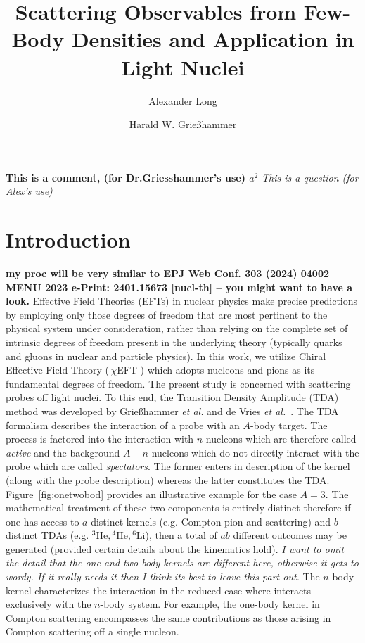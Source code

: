 \documentclass[a4paper,11pt]{article}
\title{Scattering Observables from Few-Body Densities and Application
in Light Nuclei}
\author*{Alexander Long}
\author{Harald W. Grie{\ss}hammer}
\affiliation{Institute for Nuclear Studies, Department of
Physics,\\George Washington University, Washington DC 20052, USA}
\newcommand{\LiS}{{}^{6} \mathrm{Li} }
\newcommand{\HeF}{{}^{4} \mathrm{He}}
\newcommand{\HeT}{{}^{3} \mathrm{He}}
\newcommand{\ques}[1]{\color{red}\textit{ #1 }\color{black}}
\newcommand{\com}[1]{\color{blue}\small\textbf{ #1 }\color{black}\normalsize}
\newcommand{\ChiEFT}{\,$\chi$EFT\,\,}
\begin{document}
\maketitle
\com{This is a comment, (for Dr.Griesshammer's use) $a^2$}
\ques{This is a question (for Alex's use)}
\section{Introduction}
\com{my proc will be very similar to 
    EPJ Web Conf. 303 (2024) 04002
        MENU 2023
e-Print:    2401.15673 [nucl-th] -- you might want to have a look.}
Effective Field Theories (EFTs) in nuclear physics make precise predictions by employing only those
degrees of freedom that are most pertinent to the physical system
under consideration, rather than relying on the complete set of
intrinsic degrees of freedom present in the underlying theory
(typically quarks and gluons in nuclear and particle physics). In this work, we utilize Chiral
Effective Field Theory (\ChiEFT) which adopts nucleons and pions
as its fundamental degrees of freedom.
The present study is concerned with scattering probes off
light nuclei. To this end, the Transition Density Amplitude (TDA)
method was developed by Grie\ss hammer \textit{et al.} and de Vries
\textit{et al.}~\cite{hammer2020, Vries2024}. The TDA formalism
describes the interaction of a probe with an $A$-body target.
The process is factored into the interaction with $n$ nucleons  which are therefore called \textit{active}
and the background $A-n$ nucleons which do not directly interact with the probe which are called \textit{spectators}.
The former enters in description of the kernel (along with the probe description) whereas the latter constitutes the TDA.
Figure~\ref{fig:onetwobod} provides an illustrative
example for the case $A=3$.
The mathematical treatment of these two components is entirely distinct
therefore if one has access to $a$ distinct kernels (e.g. Compton pion and scattering)
and $b$ distinct TDAs (e.g. $\HeT, \HeF, \LiS$), then a total of $ab$ different outcomes may be
generated (provided certain details about the kinematics hold). 
\ques{I want to omit the detail that the one and two body kernels are different here, otherwise it gets to wordy. If it really needs
it then I think its best to leave this part out.}
The $n$-body kernel characterizes the interaction in the reduced case
where interacts exclusively with the $n$-body
system. For example, the one-body kernel in Compton scattering
encompasses the same contributions as those arising in Compton
scattering off a single nucleon. 
\end{document}
